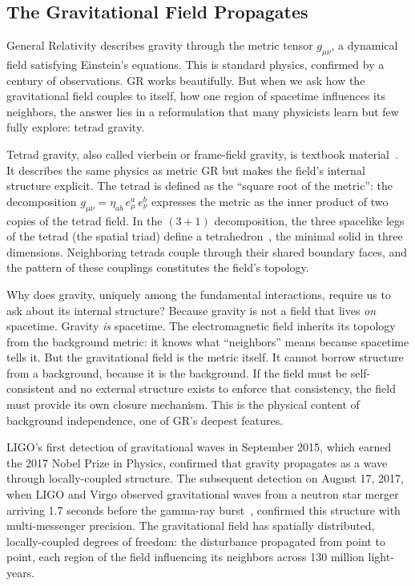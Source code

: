 \documentclass[aps,prd,preprint,superscriptaddress,showpacs,preprintnumbers,amsmath,amssymb,nofootinbib]{revtex4-2}
\begin{document}
\subsection{The Gravitational Field Propagates}
\label{subsec:propagates}

General Relativity describes gravity through the metric tensor $g_{\mu\nu}$, a dynamical field satisfying Einstein's equations. This is standard physics, confirmed by a century of observations. GR works beautifully. But when we ask how the gravitational field couples to itself, how one region of spacetime influences its neighbors, the answer lies in a reformulation that many physicists learn but few fully explore: tetrad gravity.

Tetrad gravity, also called vierbein or frame-field gravity, is textbook material~\cite{mtw1973,wald1984}. It describes the same physics as metric GR but makes the field's internal structure explicit. The tetrad is defined as the ``square root of the metric'': the decomposition $g_{\mu\nu} = \eta_{ab}\,e^a_\mu\,e^b_\nu$ expresses the metric as the inner product of two copies of the tetrad field. In the $(3{+}1)$ decomposition, the three spacelike legs of the tetrad (the spatial triad) define a tetrahedron~\cite{barbieri1998}, the minimal solid in three dimensions. Neighboring tetrads couple through their shared boundary faces, and the pattern of these couplings constitutes the field's topology.

Why does gravity, uniquely among the fundamental interactions, require us to ask about its internal structure? Because gravity is not a field that lives \emph{on} spacetime. Gravity \emph{is} spacetime. The electromagnetic field inherits its topology from the background metric: it knows what ``neighbors'' means because spacetime tells it. But the gravitational field is the metric itself. It cannot borrow structure from a background, because it is the background. If the field must be self-consistent and no external structure exists to enforce that consistency, the field must provide its own closure mechanism. This is the physical content of background independence, one of GR's deepest features.

LIGO's first detection of gravitational waves in September 2015, which earned the 2017 Nobel Prize in Physics, confirmed that gravity propagates as a wave through locally-coupled structure. The subsequent detection on August 17, 2017, when LIGO and Virgo observed gravitational waves from a neutron star merger arriving 1.7 seconds before the gamma-ray burst~\cite{gw170817}, confirmed this structure with multi-messenger precision. The gravitational field has spatially distributed, locally-coupled degrees of freedom: the disturbance propagated from point to point, each region of the field influencing its neighbors across 130 million light-years.
\end{document}
